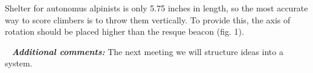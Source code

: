 \begin{enumerate*}
  	\item Shelter for autonomus alpinists is only 5.75 inches in length, so the most accurate way to score climbers is to throw them vertically. To provide this, the axis of rotation should be placed higher than the resque beacon (fig. 1).
  	\begin{figure}[H]
  		\begin{minipage}[h]{1\linewidth}
  		  \caption{}
  		\end{minipage}
  	\end{figure}
  	
  \end{enumerate*}
  
   \newline
  \textit{\textbf{Additional comments:}} The next meeting we will structure ideas into a system.
  
\fillpage
